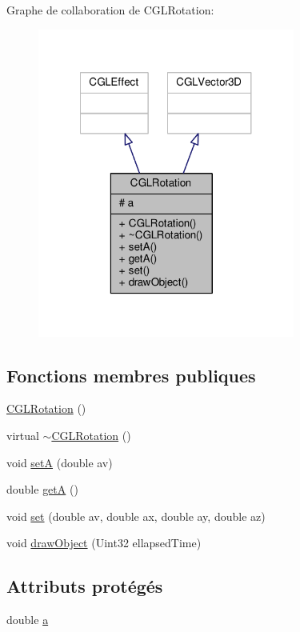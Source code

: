 Graphe de collaboration de C\-G\-L\-Rotation\-:
\nopagebreak
\begin{figure}[H]
\begin{center}
\leavevmode
\includegraphics[width=239pt]{d0/db1/class_c_g_l_rotation__coll__graph}
\end{center}
\end{figure}
\subsection*{Fonctions membres publiques}
\begin{DoxyCompactItemize}
\item 
\hyperlink{class_c_g_l_rotation_a00f328e9aeefa148e4bd169afc5cb959}{C\-G\-L\-Rotation} ()
\item 
virtual \hyperlink{class_c_g_l_rotation_adc90213d4008b9beb3c8e266f952a509}{$\sim$\-C\-G\-L\-Rotation} ()
\item 
void \hyperlink{class_c_g_l_rotation_a690f30f8f121b27ac22d6b02a6443b58}{set\-A} (double av)
\item 
double \hyperlink{class_c_g_l_rotation_a0d836220b7b39ee00173ee4e0bb4da92}{get\-A} ()
\item 
void \hyperlink{class_c_g_l_rotation_a2b767e088f36ceef91e7259c76f7390e}{set} (double av, double ax, double ay, double az)
\item 
void \hyperlink{class_c_g_l_rotation_a94be2c089fbe52d0f8cb33ee98f8de74}{draw\-Object} (Uint32 ellapsed\-Time)
\end{DoxyCompactItemize}
\subsection*{Attributs protégés}
\begin{DoxyCompactItemize}
\item 
double \hyperlink{class_c_g_l_rotation_aa5ffb501251affad642b454910540c6c}{a}
\end{DoxyCompactItemize}


